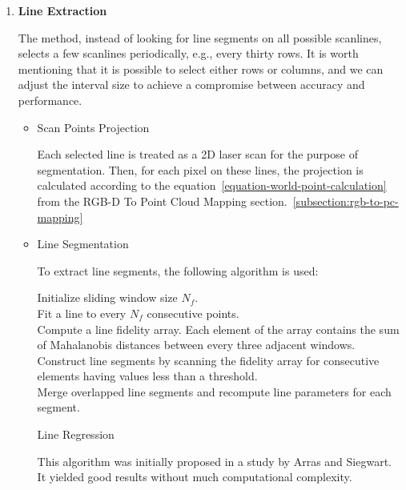 \begin{enumerate}

\item \textbf{Line Extraction}

The method, instead of looking for line segments on all possible scanlines,
selects a few scanlines periodically, e.g., every thirty rows.
It is worth mentioning that it is possible to select either rows or columns,
and we can adjust the interval size to achieve a compromise between accuracy and performance.

\begin{itemize}

    \item Scan Points Projection

    Each selected line is treated as a 2D laser scan for the purpose of segmentation.
    Then, for each pixel on these lines, the projection is calculated according
    to the equation~\ref{equation-world-point-calculation}
    from the RGB-D To Point Cloud Mapping section.~\ref{subsection:rgb-to-pc-mapping}

    \item Line Segmentation

    To extract line segments, the following algorithm is used:

    \begin{minipage}{\linewidth}
    \begin{algorithm}[H] \label{alg:line-regression}
        \SetAlgoLined
        
        Initialize sliding window size $N_f$. \\
        Fit a line to every $N_f$ consecutive points. \\
        Compute a line fidelity array. Each element of the array contains
        the sum of Mahalanobis distances between every three adjacent
        windows. \\
        Construct line segments by scanning the fidelity array for
        consecutive elements having values less than a threshold. \\
        Merge overlapped line segments and recompute line
        parameters for each segment.
        
        \caption{Line Regression \cite{articleFPSLinePrimitivesRGBD}}
    \end{algorithm}
    \end{minipage}

    This algorithm was initially proposed in a study by Arras and Siegwart. \cite{articleWithLineRegression}
    It yielded good results without much computational complexity.


\end{itemize}
\end{enumerate}
